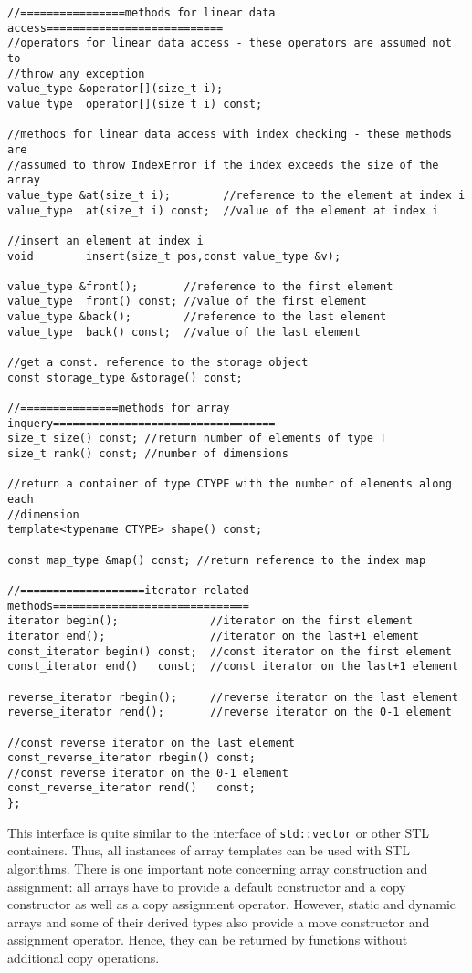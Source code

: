 \begin{verbatim}
//================methods for linear data access===========================
//operators for linear data access - these operators are assumed not to
//throw any exception
value_type &operator[](size_t i);
value_type  operator[](size_t i) const;

//methods for linear data access with index checking - these methods are
//assumed to throw IndexError if the index exceeds the size of the array
value_type &at(size_t i);        //reference to the element at index i
value_type  at(size_t i) const;  //value of the element at index i

//insert an element at index i
void        insert(size_t pos,const value_type &v);

value_type &front();       //reference to the first element
value_type  front() const; //value of the first element
value_type &back();        //reference to the last element
value_type  back() const;  //value of the last element

//get a const. reference to the storage object
const storage_type &storage() const;

//===============methods for array inquery==================================
size_t size() const; //return number of elements of type T
size_t rank() const; //number of dimensions

//return a container of type CTYPE with the number of elements along each
//dimension
template<typename CTYPE> shape() const;

const map_type &map() const; //return reference to the index map

//===================iterator related methods==============================
iterator begin();              //iterator on the first element
iterator end();                //iterator on the last+1 element
const_iterator begin() const;  //const iterator on the first element
const_iterator end()   const;  //const iterator on the last+1 element

reverse_iterator rbegin();     //reverse iterator on the last element
reverse_iterator rend();       //reverse iterator on the 0-1 element

//const reverse iterator on the last element
const_reverse_iterator rbegin() const; 
//const reverse iterator on the 0-1 element
const_reverse_iterator rend()   const;
};
\end{verbatim}

This interface is quite similar to the interface of \texttt{std::vector} or other
STL containers. Thus, all instances of array templates can be used with STL
algorithms. There is one important note concerning array construction and
assignment: all arrays have to provide a default constructor and a copy
constructor as well as a copy assignment operator. However, static and dynamic
arrays and some of their derived types also provide a move constructor and
assignment operator. Hence, they can be returned by functions without additional
copy operations.
